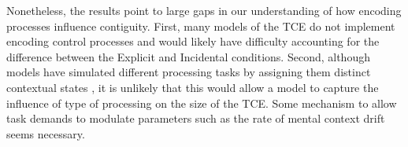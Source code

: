 \documentclass[jou,natbib]{apa6} %
\begin{document}
Nonetheless, the results point to large gaps in our understanding of how encoding processes influence contiguity. First, many models of the TCE do not implement encoding control processes \citep[but see][]{LehmMalm13} and would likely have difficulty accounting for the difference between the Explicit and Incidental conditions. Second, although models have simulated different processing tasks by assigning them distinct contextual states \citep{PolyEtal09}, it is unlikely that this would allow a model to capture the influence of type of processing on the size of the TCE. Some mechanism to allow task demands to modulate parameters such as the rate of mental context drift seems necessary.  







  

  






\end{document}
